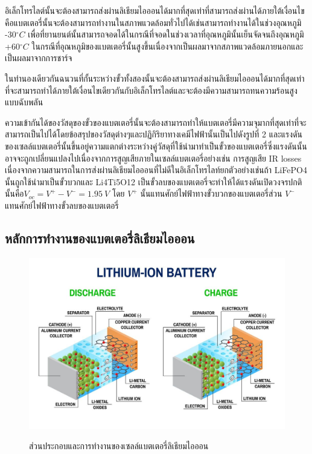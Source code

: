 \begin{itemize}
 {\item 
 	อิเล็กโทรไลต์นั้นจะต้องสามารถส่งผ่านลิเธียมไอออนได้มากที่สุดเท่าที่สามารถส่งผ่านได้ภายใต้เงื่อนไขคือแบตเตอรี่นั้นจะต้องสามารถทำงานในสภาพแวดล้อมทั่วไปได้เช่นสามารถทำงานได้ในช่วงอุณหภูมิ -30$^\circ C$ 	 	     เพื่อที่ยานยนต์นั้นสามารถจอดได้ในกรณีที่จอดในช่วงเวลาที่อุณหภูมินั้นเย็นจัดจนถึงอุณหภูมิ +60$^\circ C$ ในกรณีที่อุณหภูมิของแบตเตอรี่นั้นสูงขึ้นเนื่องจากเป็นผลมาจากสภาพแวดล้อมภายนอกและเป็นผลมาจากการชาร์จ}
 {\item 
 	ในทำนองเดียวกันฉนวนที่กั้นระหว่างขั้วทั้งสองนั้นจะต้องสามารถส่งผ่านลิเธียมไอออนได้มากที่สุดเท่าที่จะสามารถทำได้ภายใต้เงื่อนไขเดียวกันกับอิเล็กโทรไลต์และจะต้องมีความสามารถทนความร้อนสูงแบบฉับพลัน
 }
 {\item 
 	ความเข้ากันได้ของวัสดุของขั้วของแบตเตอรี่นั้นจะต้องสามารถทำให้แบตเตอรี่มีความจุมากที่สุดเท่าที่จะสามารถเป็นไปได้โดยข้อสรุปของวัสดุต่างๆและปฏิกิริยาทางเคมีไฟฟ้านั้นเป็นไปดังรูปที่ 2 	       และแรงดันของเซลล์แบตเตอรี่นั้นขึ้นอยู่ความแตกต่างระหว่างคู่วัสดุที่ใช้นำมาทำเป็นขั้วของแบตเตอรี่ซึ่งแรงดันนั้นอาจจะถูกเปลี่ยนแปลงไปเนื่องจากการสูญเสียภายในเซลล์แบตเตอรี่อย่างเช่น การสูญเสีย IR losses เนื่องจากความสามารถในการส่งผ่านลิเธียมไอออนที่ไม่ดีในอิเล็กโทรไลท์ยกตัวอย่างเช่นถ้า LiFePO4 นั้นถูกใช้นำมาเป็นขั้วบวกและ Li4Ti5O12 เป็นขั้วลบของแบตเตอรี่จะทำให้ได้แรงดันเปิดวงจรปกตินั้นคือ$V_{oc}=V^+-V^-=1.95\ V$ โดย $V^+$ นั้นแทนศักย์ไฟฟ้าทางขั้วบวกของแบตเตอรี่ส่วน $V^-$ แทนศักย์ไฟฟ้าทางขั้วลบของแบตเตอรี่
 }
\end{itemize}


\subsection{หลักการทำงานของแบตเตอรี่ลิเธียมไอออน}
\begin{center}
	\begin{figure}[!h]
		\includegraphics[width=0.6\linewidth]{Chapters/img/battery_structure.png}
			\centering
			\captionsetup{justification=centering,margin=2cm}
			\caption{ส่วนประกอบและการทำงานของเซลล์แบตเตอรี่ลิเธียมไอออน}
			\cite{BatteryStructure}
			\label{fig:Battery_Struc}
	\end{figure}
\end{center}

